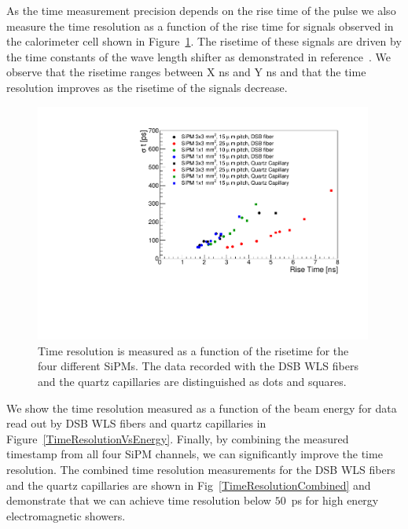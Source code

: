 As the time measurement precision depends on the rise time of the pulse we also
measure the time resolution as a function of the rise time for signals observed 
in the calorimeter cell shown in Figure~\ref{RiseTime}. The risetime of these signals 
are driven by the time constants of the wave length shifter as 
demonstrated in reference~\cite{lysotiming}. We observe that the risetime
ranges between X ns and Y ns and that the time resolution improves as the 
risetime of the signals decrease. 


\begin{figure}[htb]
\centering
\includegraphics[width=0.99\textwidth]{figures/ShashlikTimeResolutionVsRiseTime.pdf}
\caption{\label{RiseTime}Time resolution is measured as a function of the risetime
for the four different SiPMs. The data recorded with the DSB WLS fibers and the
quartz capillaries are distinguished as dots and squares. }
\end{figure}



We show the time resolution measured as a function of the beam energy for
data read out by DSB WLS fibers and quartz capillaries in 
Figure~\ref{TimeResolutionVsEnergy}. Finally, by combining the measured timestamp
from all four SiPM channels, we can significantly improve the time resolution.
The combined time resolution measurements for the DSB WLS fibers and the quartz capillaries are shown in
Fig~\ref{TimeResolutionCombined} and demonstrate that we can achieve time resolution
below $50$~ps for high energy electromagnetic showers.


